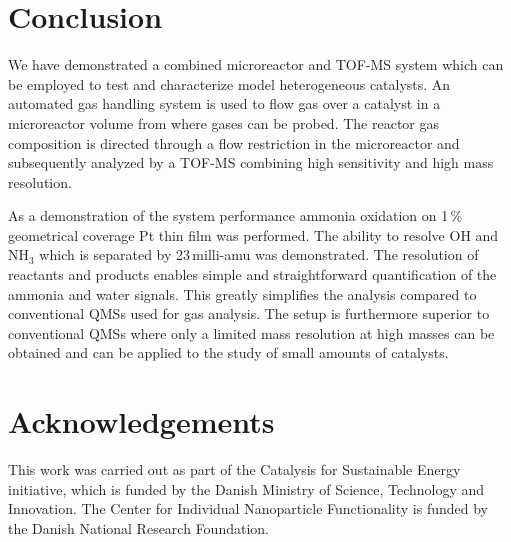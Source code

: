 \documentclass[aip,rsi]{revtex4-1}
\begin{document}
\section{Conclusion}
We have demonstrated a combined microreactor and TOF-MS system which can be employed to test and characterize model heterogeneous catalysts. An automated gas handling system is used to flow gas over a catalyst in a microreactor volume from where gases can be probed. The reactor gas composition is directed through a flow restriction in the microreactor and subsequently analyzed by a TOF-MS combining high sensitivity and high mass resolution.

As a demonstration of the system performance ammonia oxidation on 1\,\% geometrical coverage Pt thin film was performed. The ability to resolve OH and NH$_3$ which is separated by 23\,milli-amu was demonstrated. The resolution of reactants and products enables simple and straightforward quantification of the ammonia and water signals. This greatly simplifies the analysis compared to conventional QMSs used for gas analysis. The setup is furthermore superior to conventional QMSs where only a limited mass resolution at high masses can be obtained and can be applied to the study of small amounts of catalysts.

\section{Acknowledgements}
This work was carried out as part of the Catalysis for Sustainable Energy initiative, which is funded by the Danish Ministry of Science, Technology and Innovation. The Center for Individual Nanoparticle Functionality is funded by the Danish National Research Foundation.


\end{document}
